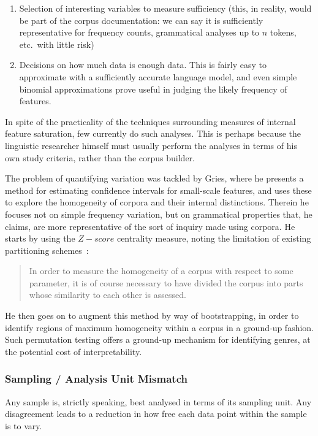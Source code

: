 \begin{enumerate}
 \item Selection of interesting variables to measure sufficiency (this, in reality, would be part of the corpus documentation: we can say it is sufficiently representative for frequency counts, grammatical analyses up to $n$ tokens, etc.\ with little risk)
 \item Decisions on how much data is enough data.  This is fairly easy to approximate with a sufficiently accurate language model, and even simple binomial approximations prove useful in judging the likely frequency of features.
\end{enumerate}

In spite of the practicality of the techniques surrounding measures of internal feature saturation, few currently do such analyses.  This is perhaps because the linguistic researcher himself must usually perform the analyses in terms of his own study criteria, rather than the corpus builder.

The problem of quantifying variation was tackled by Gries\cite{gries2006exploring}, where he presents a method for estimating confidence intervals for small-scale features, and uses these to explore the homogeneity of corpora and their internal distinctions.  Therein he focuses not on simple frequency variation, but on grammatical properties that, he claims, are more representative of the sort of inquiry made using corpora.  He starts by using the $Z-score$ centrality measure, noting the limitation of existing partitioning schemes~\cite[p.123]{gries2006exploring}:

\begin{quote}
In order to measure the homogeneity of a corpus with respect to some parameter, it is of course necessary to have divided the corpus into parts whose similarity to each other is assessed. 
\end{quote}

He then goes on to augment this method by way of bootstrapping, in order to identify regions of maximum homogeneity within a corpus in a ground-up fashion.  Such permutation testing offers a ground-up mechanism for identifying genres, at the potential cost of interpretability.




\subsubsection{Sampling / Analysis Unit Mismatch}
Any sample is, strictly speaking, best analysed in terms of its sampling unit.  Any disagreement leads to a reduction in how free each data point within the sample is to vary\cite{kilgarriff2005language,lijffijt2014significance,paquot2009distinctive}.

